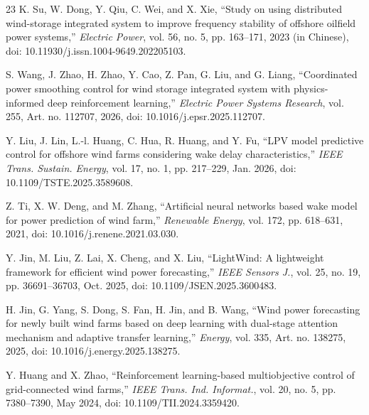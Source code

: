 \documentclass[lettersize,journal]{IEEEtran}
\begin{document}
\begin{thebibliography}{23}
K. Su, W. Dong, Y. Qiu, C. Wei, and X. Xie, ``Study on using distributed wind-storage integrated system to improve frequency stability of offshore oilfield power systems,'' \textit{Electric Power}, vol. 56, no. 5, pp. 163--171, 2023 (in Chinese), doi: 10.11930/j.issn.1004-9649.202205103.

S. Wang, J. Zhao, H. Zhao, Y. Cao, Z. Pan, G. Liu, and G. Liang, ``Coordinated power smoothing control for wind storage integrated system with physics-informed deep reinforcement learning,'' \textit{Electric Power Systems Research}, vol. 255, Art. no. 112707, 2026, doi: 10.1016/j.epsr.2025.112707.

Y. Liu, J. Lin, L.-l. Huang, C. Hua, R. Huang, and Y. Fu, ``LPV model predictive control for offshore wind farms considering wake delay characteristics,'' \textit{IEEE Trans. Sustain. Energy}, vol. 17, no. 1, pp. 217--229, Jan. 2026, doi: 10.1109/TSTE.2025.3589608.

Z. Ti, X. W. Deng, and M. Zhang, ``Artificial neural networks based wake model for power prediction of wind farm,'' \textit{Renewable Energy}, vol. 172, pp. 618--631, 2021, doi: 10.1016/j.renene.2021.03.030.

Y. Jin, M. Liu, Z. Lai, X. Cheng, and X. Liu, ``LightWind: A lightweight framework for efficient wind power forecasting,'' \textit{IEEE Sensors J.}, vol. 25, no. 19, pp. 36691--36703, Oct. 2025, doi: 10.1109/JSEN.2025.3600483.

H. Jin, G. Yang, S. Dong, S. Fan, H. Jin, and B. Wang, ``Wind power forecasting for newly built wind farms based on deep learning with dual-stage attention mechanism and adaptive transfer learning,'' \textit{Energy}, vol. 335, Art. no. 138275, 2025, doi: 10.1016/j.energy.2025.138275.

Y. Huang and X. Zhao, ``Reinforcement learning-based multiobjective control of grid-connected wind farms,'' \textit{IEEE Trans. Ind. Informat.}, vol. 20, no. 5, pp. 7380--7390, May 2024, doi: 10.1109/TII.2024.3359420.


\end{thebibliography}
\end{document}
